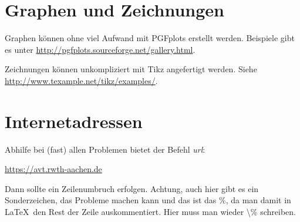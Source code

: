 \section{Graphen und Zeichnungen}

Graphen können ohne viel Aufwand mit PGFplots erstellt werden. Beispiele gibt es unter \url{http://pgfplots.sourceforge.net/gallery.html}.
\begin{center}
\end{center}

Zeichnungen können unkompliziert mit Tikz angefertigt werden. Siehe \url{http://www.texample.net/tikz/examples/}.
\begin{center}
\end{center}


\section{Internetadressen}

Abhilfe bei (fast) allen Problemen bietet der Befehl \emph{url}:

\url{https://avt.rwth-aachen.de}

Dann sollte ein Zeilenumbruch erfolgen. Achtung, auch hier gibt es ein Sonderzeichen, das Probleme machen kann und das ist das \%, da man damit in \LaTeX\ den Rest der Zeile auskommentiert. Hier muss man wieder \textbackslash \% schreiben.

